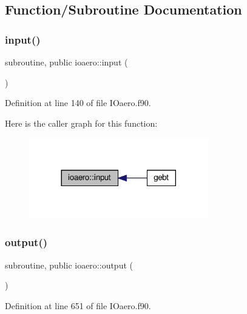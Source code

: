 \subsection{Function/\+Subroutine Documentation}
\mbox{\label{namespaceioaero_a039bc1aae10012ce8e368bc202bb81be}} 
\subsubsection{\texorpdfstring{input()}{input()}}
{\footnotesize\ttfamily subroutine, public ioaero\+::input (\begin{DoxyParamCaption}{ }\end{DoxyParamCaption})}



Definition at line 140 of file I\+Oaero.\+f90.

Here is the caller graph for this function\+:\nopagebreak
\begin{figure}[H]
\begin{center}
\leavevmode
\includegraphics[width=221pt]{namespaceioaero_a039bc1aae10012ce8e368bc202bb81be_icgraph}
\end{center}
\end{figure}
\mbox{\label{namespaceioaero_a1f2f8f2b4f6e233d2753c1fd1809a44a}} 
\subsubsection{\texorpdfstring{output()}{output()}}
{\footnotesize\ttfamily subroutine, public ioaero\+::output (\begin{DoxyParamCaption}{ }\end{DoxyParamCaption})}



Definition at line 651 of file I\+Oaero.\+f90.

